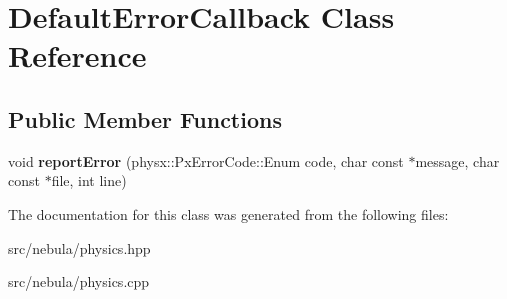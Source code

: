 \hypertarget{classDefaultErrorCallback}{
\section{DefaultErrorCallback Class Reference}
\label{classDefaultErrorCallback}
}
\subsection*{Public Member Functions}
\begin{DoxyCompactItemize}
\item 
\hypertarget{classDefaultErrorCallback_ae95118f6a45b47a1b72af9417f80d84e}{
void {\bfseries reportError} (physx::PxErrorCode::Enum code, char const $\ast$message, char const $\ast$file, int line)}
\label{classDefaultErrorCallback_ae95118f6a45b47a1b72af9417f80d84e}

\end{DoxyCompactItemize}


The documentation for this class was generated from the following files:\begin{DoxyCompactItemize}
\item 
src/nebula/physics.hpp\item 
src/nebula/physics.cpp\end{DoxyCompactItemize}
